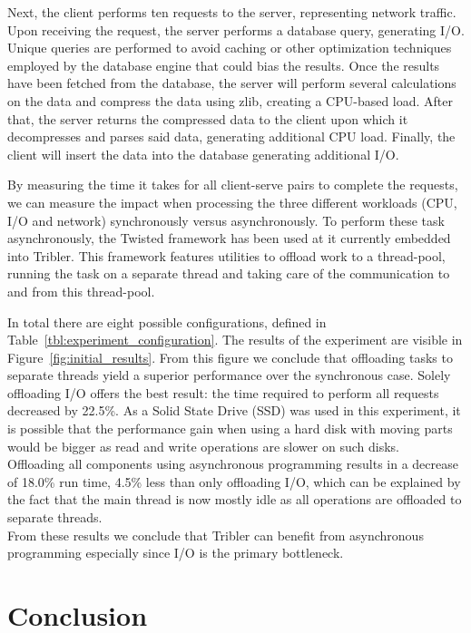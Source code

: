 Next, the client performs ten requests to the server, representing network traffic.
Upon receiving the request, the server performs a database query, generating I/O.
Unique queries are performed to avoid caching or other optimization techniques employed by the database engine that could bias the results.
Once the results have been fetched from the database, the server will perform several calculations on the data and compress the data using zlib, creating a CPU-based load.
After that, the server returns the compressed data to the client upon which it decompresses and parses said data, generating additional CPU load.
Finally, the client will insert the data into the database generating additional I/O.

By measuring the time it takes for all client-serve pairs to complete the requests, we can measure the impact when processing the three different workloads (CPU, I/O and network) synchronously versus asynchronously.
To perform these task asynchronously, the Twisted framework has been used at it currently embedded into Tribler.
This framework features utilities to offload work to a thread-pool, running the task on a separate thread and taking care of the communication to and from this thread-pool.

In total there are eight possible configurations, defined in Table~\ref{tbl:experiment_configuration}.
The results of the experiment are visible in Figure~\ref{fig:initial_results}.
From this figure we conclude that offloading tasks to separate threads yield a superior performance over the synchronous case. Solely offloading I/O offers the best result: the time required to perform all requests decreased by 22.5\%.
As a Solid State Drive (SSD) was used in this experiment, it is possible that the performance gain when using a hard disk with moving parts would be bigger as read and write operations are slower on such disks.\\
Offloading all components using asynchronous programming results in a decrease of 18.0\% run time, 4.5\% less than only offloading I/O, which can be explained by the fact that the main thread is now mostly idle as all operations are offloaded to separate threads.\\
From these results we conclude that Tribler can benefit from asynchronous programming especially since I/O is the primary bottleneck.

\section{Conclusion}

